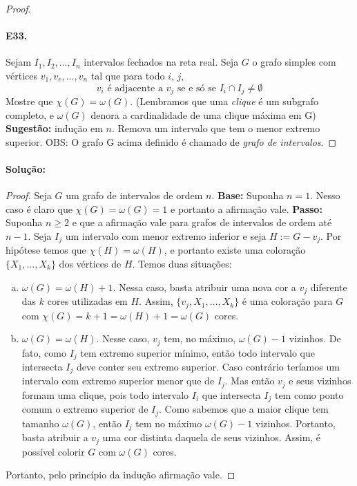 \documentclass[11pt,a4paper,notitlepage]{exam}
\begin{document}
\begin{proof}
    \paragraph{E33.} Sejam $I_1, I_2, \dots, I_n$ intervalos
    fechados na reta real. Seja $G$ o grafo simples com vértices
    $v_1, v_e, \dots, v_n$ tal que para todo $i$, $j$,
    $$
    v_i \text{ é adjacente a } v_j \text{ se e só se } I_i\cap I_j
    \neq \emptyset
    $$
    Mostre que $\chi(G) = \omega(G)$. (Lembramos que uma
    \textit{clique} é um subgrafo completo, e $\omega(G)$ denora a
    cardinalidade de uma clique máxima em G) \textbf{Sugestão:} indução
    em $n$. Remova um intervalo que tem o menor extremo
    superior.\medskip\newline
    OBS: O grafo G acima definido é chamado de \textit{grafo de
    intervalos}.
\end{proof}

\paragraph{Solução:}

\begin{proof}
    Seja $G$ um grafo de intervalos de ordem $n$.\newline
    \textbf{Base:} Suponha $n=1$. Nesso caso é claro que $\chi(G)
    = \omega(G) = 1$ e portanto a afirmação vale.\newline
    \textbf{Passo:} Suponha $n \geq 2$ e que a afirmação vale para
    grafos de intervalos de ordem até $n-1$. Seja $I_j$ um
    intervalo com menor extremo inferior e seja $H := G-v_j$. Por
    hipótese temos que $\chi(H) = \omega(H)$, e portanto existe uma
    coloração $\{X_1,\dots,X_{k}\}$  dos vértices de $H$.
    Temos duas situações:
    \begin{enumerate}[a)]
        \item $\omega(G) = \omega(H) + 1$. Nessa caso, basta atribuir
            uma nova cor a $v_j$ diferente das $k$ cores
            utilizadas em $H$. Assim, $\{{v_j},X_1,\dots,X_{k} \}$ é
            uma coloração para $G$ com $\chi(G) = k+1 = \omega(H)
            + 1 = \omega(G)$ cores.
        \item $\omega(G) = \omega(H)$. Nesse caso, $v_j$ tem, no
            máximo, $\omega(G)-1$ vizinhos. De fato, como $I_j$ tem
            extremo superior mínimo, então todo intervalo que
            intersecta $I_j$ deve conter seu extremo superior. Caso
            contrário teríamos um intervalo com extremo superior menor
            que de $I_j$. Mas então $v_j$ e seus vizinhos formam
            uma clique, pois todo intervalo $I_i$ que
            intersecta $I_j$ tem como ponto comum o extremo superior
            de $I_j$. Como sabemos que a maior clique tem tamanho
                $\omega(G)$, então $I_j$ tem no máximo $\omega(G) -1$
            vizinhos. Portanto, basta atribuir a $v_j$ uma cor distinta
            daquela de seus vizinhos. Assim, é possível colorir
            $G$ com $\omega(G)$ cores.
    \end{enumerate}
    Portanto, pelo princípio da indução afirmação vale.
\end{proof}
\end{document}
